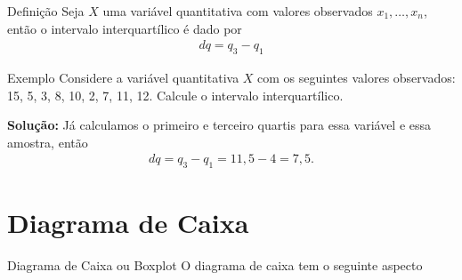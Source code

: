 \documentclass[8pt]{beamer}
\begin{document}
\begin{frame}

\begin{block}{Definição}
 Seja $X$ uma variável quantitativa com valores observados $x_1, \dots, x_n$, então o intervalo interquartílico é dado por
 \begin{align*}
  dq = q_3-q_1
 \end{align*}
\end{block}


\begin{block}{Exemplo}
 Considere a variável quantitativa $X$ com os seguintes valores observados: 15, 5, 3, 8, 10, 2, 7, 11, 12. Calcule o intervalo interquartílico.
 
 \textbf{Solução:} Já calculamos o primeiro e terceiro quartis para essa variável e essa amostra, então
 \begin{align*}
  dq = q_3 - q_1= 11,5 - 4 = 7,5.
 \end{align*}
\end{block}
\end{frame}


\section{Diagrama de Caixa}

\begin{frame}{Diagrama de Caixa ou Boxplot}
 O diagrama de caixa tem o seguinte aspecto
 \begin{figure}
 \end{figure}

\end{frame}
\end{document}
